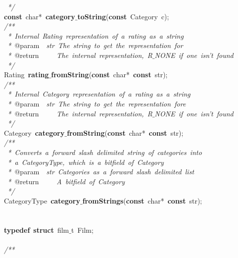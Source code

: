 \documentclass{article}
\begin{document}
\mbox{}\textit{\ */} \\
\mbox{}\textbf{const}\ char*\ \textbf{category$\_$toString}(\textbf{const}\ Category\ c); \\
\mbox{}\textit{/**} \\
\mbox{}\textit{\ *\ Internal\ Rating\ representation\ of\ a\ rating\ as\ a\ string} \\
\mbox{}\textit{\ *\ }@param\textit{\ \ str\ The\ string\ to\ get\ the\ representation\ for} \\
\mbox{}\textit{\ *\ }@return\textit{\ \ \ \ \ The\ internal\ representation,\ R$\_$NONE\ if\ one\ isn't\ found} \\
\mbox{}\textit{\ */} \\
\mbox{}Rating\ \textbf{rating$\_$fromString}(\textbf{const}\ char*\ \textbf{const}\ str); \\
\mbox{}\textit{/**} \\
\mbox{}\textit{\ *\ Internal\ Category\ representation\ of\ a\ rating\ as\ a\ string} \\
\mbox{}\textit{\ *\ }@param\textit{\ \ str\ The\ string\ to\ get\ the\ representation\ fore} \\
\mbox{}\textit{\ *\ }@return\textit{\ \ \ \ \ The\ internal\ representation,\ R$\_$NONE\ if\ one\ isn't\ found} \\
\mbox{}\textit{\ */} \\
\mbox{}Category\ \textbf{category$\_$fromString}(\textbf{const}\ char*\ \textbf{const}\ str); \\
\mbox{}\textit{/**} \\
\mbox{}\textit{\ *\ Converts\ a\ forward\ slash\ delimited\ string\ of\ categories\ into} \\
\mbox{}\textit{\ *\ a\ CategoryType,\ which\ is\ a\ bitfield\ of\ Category} \\
\mbox{}\textit{\ *\ }@param\textit{\ \ str\ Categories\ as\ a\ forward\ slash\ delimited\ list} \\
\mbox{}\textit{\ *\ }@return\textit{\ \ \ \ \ A\ bitfield\ of\ Category} \\
\mbox{}\textit{\ */} \\
\mbox{}CategoryType\ \textbf{category$\_$fromStrings}(\textbf{const}\ char*\ \textbf{const}\ str); \\
\mbox{} \\
\mbox{} \\
\mbox{}\textbf{typedef}\ \textbf{struct}\ film$\_$t\ Film; \\
\mbox{} \\
\mbox{}\textit{/**} \\
\end{document}
